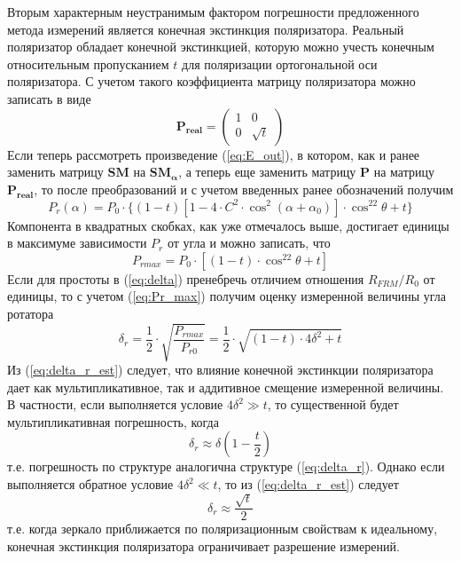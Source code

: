 \documentclass{article}
\begin{document}
Вторым характерным неустранимым фактором погрешности предложенного метода измерений является конечная экстинкция поляризатора.
Реальный поляризатор обладает конечной экстинкцией, которую можно учесть конечным относительным пропусканием $t$ для поляризации ортогональной оси поляризатора.
С учетом такого коэффициента матрицу поляризатора можно записать в виде      
\begin{equation}
	\bm{P_{real}} = 
	\begin{pmatrix}
		1 & 0 \\
		0 & \sqrt{t}
	\end{pmatrix}	
\end{equation}
Если теперь рассмотреть произведение (\ref{eq:E_out}), в котором, как и ранее заменить матрицу $\bm{SM}$ на $\bm{SM_\alpha}$, а теперь еще заменить матрицу $\bm{P}$ на матрицу $\bm{P_{real}}$, то после преобразований и с учетом введенных ранее обозначений получим
\begin{equation}
    P_r(\alpha)=P_0\cdot\{(1-t)\left[ 1-4\cdot C^2\cdot \cos^2(\alpha+\alpha_0) \right]\cdot \cos^22\theta+t \}
\end{equation}
Компонента в квадратных скобках, как уже отмечалось выше, достигает единицы в максимуме зависимости $P_r$ от угла и можно записать, что 
\begin{equation}
    \label{eq:Pr_max}
    P_{rmax}=P_0\cdot\left[(1-t)\cdot \cos^22\theta+t \right]
\end{equation}
Если для простоты в (\ref{eq:delta}) пренебречь отличием отношения $R_{FRM}/R_0 $ от единицы, то с учетом (\ref{eq:Pr_max}) получим оценку измеренной величины угла ротатора
\begin{equation}
    \label{eq:delta_r_est}
    \delta_r=\frac{1}{2}\cdot\sqrt{\frac{P_{rmax}}{P_{r0}}}=\frac{1}{2}\cdot\sqrt{(1-t)\cdot4\delta^2+t}
\end{equation}
Из (\ref{eq:delta_r_est}) следует, что влияние конечной экстинкции поляризатора дает как мультипликативное, так и аддитивное смещение измеренной величины. В частности, если выполняется условие $4\delta^2 \gg t$, то существенной будет мультипликативная погрешность, когда
\begin{equation}
    \delta_r\approx\delta\left(1-\frac{t}{2}\right)
\end{equation}
т.е. погрешность по структуре аналогична структуре (\ref{eq:delta_r}). Однако если выполняется обратное условие $4\delta^2\ll t$, то из (\ref{eq:delta_r_est}) следует
\begin{equation}
    \delta_r\approx\frac{\sqrt{t}}{2}
\end{equation}
т.е. когда зеркало приближается по поляризационным свойствам к идеальному, конечная экстинкция поляризатора ограничивает разрешение измерений.
\end{document}
